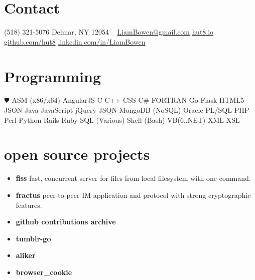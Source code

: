 \documentclass[]{friggeri-cv} %
\begin{document}


\begin{aside} %
\section{Contact}
(518) 321-5076
Delmar, NY 12054
~
\href{mailto:LiamBowen@gmail.com}{LiamBowen@gmail.com}
\href{http://hut8.io}{hut8.io}
\href{https://github.com/hut8}{github.com/hut8}
\href{https://linkedin.com/in/LiamBowen}{linkedin.com/in/LiamBowen}
~
\section{Programming}
{\color{red} $\varheartsuit$}
ASM (x86/x64)
AngularJS
C
C++
CSS
C\#
FORTRAN
Go
Flask
HTML5
JSON
Java
JavaScript
jQuery
JSON
MongoDB (NoSQL)
Oracle PL/SQL
PHP
Perl
Python
Rails
Ruby
SQL (Various)
Shell (Bash)
VB(6,.NET)
XML
XSL
\end{aside}


\section{open source projects}

\begin{itemize}
\item \textbf{fiss} fast, concurrent server for files from local filesystem with one command.
\item \textbf{fractus} peer-to-peer IM application and protocol with strong cryptographic features.
\item \textbf{github contributions archive}
\item \textbf{tumblr-go}
\item \textbf{aliker}
\item \textbf{browser\_cookie}
\end{itemize}

\end{document}
